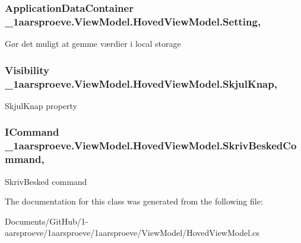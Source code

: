 \subsubsection[{Setting}]{\setlength{\rightskip}{0pt plus 5cm}Application\+Data\+Container \+\_\+1aarsproeve.\+View\+Model.\+Hoved\+View\+Model.\+Setting\hspace{0.3cm}{\ttfamily [get]}, {\ttfamily [set]}}\label{class__1aarsproeve_1_1_view_model_1_1_hoved_view_model_afbb2eb2f33bdb6defe9979b80c6e79ff}


Gør det muligt at gemme værdier i local storage 

\hypertarget{class__1aarsproeve_1_1_view_model_1_1_hoved_view_model_ab292f28c3e469ad73d6d6e648f3096f0}{}
\subsubsection[{Skjul\+Knap}]{\setlength{\rightskip}{0pt plus 5cm}Visibility \+\_\+1aarsproeve.\+View\+Model.\+Hoved\+View\+Model.\+Skjul\+Knap\hspace{0.3cm}{\ttfamily [get]}, {\ttfamily [set]}}\label{class__1aarsproeve_1_1_view_model_1_1_hoved_view_model_ab292f28c3e469ad73d6d6e648f3096f0}


Skjul\+Knap property 

\hypertarget{class__1aarsproeve_1_1_view_model_1_1_hoved_view_model_a72688ca49a29be5fc3fa18d16449387e}{}
\subsubsection[{Skriv\+Besked\+Command}]{\setlength{\rightskip}{0pt plus 5cm}I\+Command \+\_\+1aarsproeve.\+View\+Model.\+Hoved\+View\+Model.\+Skriv\+Besked\+Command\hspace{0.3cm}{\ttfamily [get]}, {\ttfamily [set]}}\label{class__1aarsproeve_1_1_view_model_1_1_hoved_view_model_a72688ca49a29be5fc3fa18d16449387e}


Skriv\+Besked command 



The documentation for this class was generated from the following file\+:\begin{DoxyCompactItemize}
\item 
Documents/\+Git\+Hub/1-\/aarsproeve/1aarsproeve/1aarsproeve/\+View\+Model/Hoved\+View\+Model.\+cs\end{DoxyCompactItemize}
